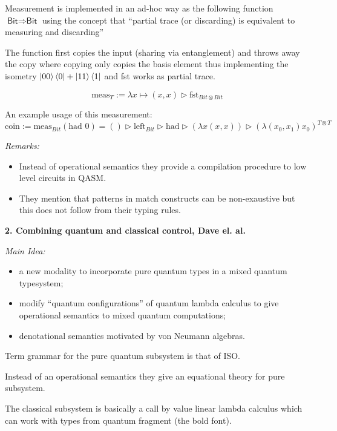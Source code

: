 \documentclass[12pt]{article}
\begin{document}
Measurement is implemented in an ad-hoc way as the following function $\textsf{Bit} \Rightarrow \textsf{Bit}$ using the
concept that ``partial trace (or discarding) is equivalent to measuring and discarding''

The function first copies the input (sharing via entanglement) and throws away the copy
where copying only copies the basis element thus implementing the isometry $\ket{00}\bra{0} + \ket{11}\bra{1}$ and \textsf{fst} works as partial trace.

\[
\text{meas}_{T} := \lambda x \mapsto (x, x) \triangleright \text{fst}_{Bit \otimes Bit}
\]

An example usage of this measurement:
\[
\text{coin} := \text{meas}_{Bit} (\text{had } 0) = () \triangleright \text{left}_{Bit} \triangleright \text{had}
   \triangleright (\lambda x  (x, x) )
   \triangleright (\lambda (x_0, x_1)  x_0 )
   ^ {T  \otimes T}
\]

\textit{Remarks:}
\begin{itemize}
  \item Instead of operational semantics they provide a compilation procedure to low level circuits in \textsf{QASM}.
        \item They mention that patterns in match constructs can be non-exaustive but this does not follow from their
        typing rules.
\end{itemize}

\textbf{2. Combining quantum and classical control, Dave el. al.}
\vspace{0.75em}

\textit{Main Idea:}
\begin{itemize}
  \item a new modality to incorporate pure quantum types in a mixed quantum typesystem;
  \item modify ``quantum configurations'' of quantum lambda calculus to give operational semantics to mixed
        quantum computations;
  \item denotational semantics motivated by von Neumann algebras.
\end{itemize}

Term grammar for the pure quantum subsystem is that of ISO.

Instead of an operational semantics they give an equational theory for pure subsystem.

The classical subsystem is basically a call by value linear lambda calculus which can work with types from quantum
fragment (the bold font).
\end{document}
